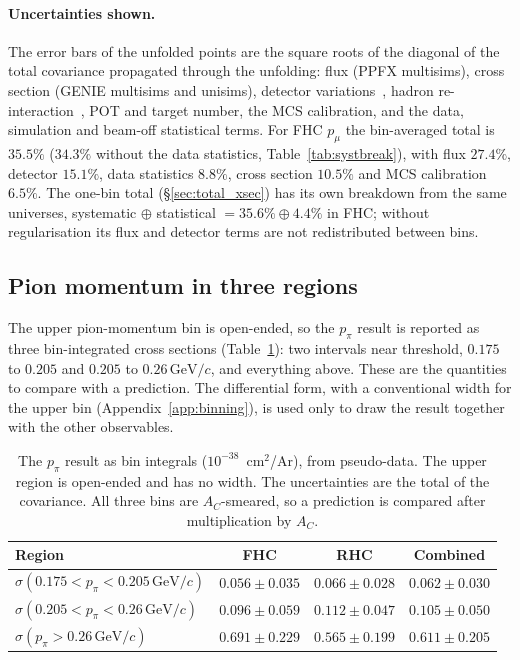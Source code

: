 \documentclass[11pt,a4paper]{article}
\newcommand{\GeVc}{\,\text{GeV}\!/c}
\begin{document}
\paragraph{Uncertainties shown.}
The error bars of the unfolded points are the square roots of the diagonal of the total covariance
propagated through the unfolding: flux (PPFX multisims), cross section (GENIE multisims and
unisims), detector variations~\cite{uboone_detvar}, hadron re-interaction~\cite{geant4reweight},
POT and target number, the MCS calibration, and the data, simulation and beam-off statistical
terms. For FHC $p_\mu$ the bin-averaged total is $35.5\%$ ($34.3\%$ without the data statistics,
Table~\ref{tab:systbreak}), with flux $27.4\%$, detector $15.1\%$, data statistics $8.8\%$, cross
section $10.5\%$ and MCS calibration $6.5\%$. The
one-bin total (\S\ref{sec:total_xsec}) has its own breakdown from the same universes, systematic
$\oplus$ statistical $=35.6\%\oplus4.4\%$ in FHC; without regularisation its flux and detector
terms are not redistributed between bins.

\subsection{Pion momentum in three regions}
\label{sec:ppi_two_region}

The upper pion-momentum bin is open-ended, so the $p_\pi$ result is reported as three bin-integrated
cross sections (Table~\ref{tab:ppi_partial_main}): two intervals near threshold, $0.175$ to $0.205$
and $0.205$ to $0.26\GeVc$, and everything above. These are the quantities to compare with a
prediction. The differential form, with a conventional width for the upper bin
(Appendix~\ref{app:binning}), is used only to draw the result together with the other observables.

\begin{table}[H]
  \centering
  \caption{The $p_\pi$ result as bin integrals ($10^{-38}$~cm$^2$/Ar), from pseudo-data. The upper
    region is open-ended and has no width. The uncertainties are the total of the covariance. All three
    bins are $A_C$-smeared, so a prediction is compared after multiplication by $A_C$.}
  \label{tab:ppi_partial_main}
  \small
  \begin{tabular}{lccc}
\toprule
Region & FHC & RHC & Combined \\
\midrule
$\sigma(0.175<p_\pi<0.205\GeVc)$ & $0.056\pm0.035$ & $0.066\pm0.028$ & $0.062\pm0.030$ \\
$\sigma(0.205<p_\pi<0.26\GeVc)$  & $0.096\pm0.059$ & $0.112\pm0.047$ & $0.105\pm0.050$ \\
$\sigma(p_\pi>0.26\GeVc)$         & $0.691\pm0.229$ & $0.565\pm0.199$ & $0.611\pm0.205$ \\
\bottomrule
\end{tabular}
\end{table}
\end{document}
